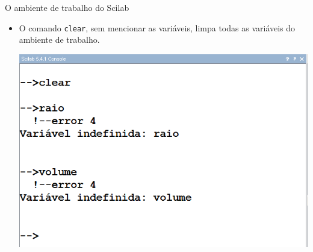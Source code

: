 \begin{frame}{O ambiente de trabalho do Scilab}
\begin{itemize}
\begin{center}
    \end{center}
    \item O comando \texttt{clear}, sem mencionar as variáveis, limpa
    todas as variáveis do ambiente de trabalho.
    \begin{center}
      \includegraphics[scale=0.4]{images/clear2.png}
    \end{center}
  \end{itemize}
\end{frame}

